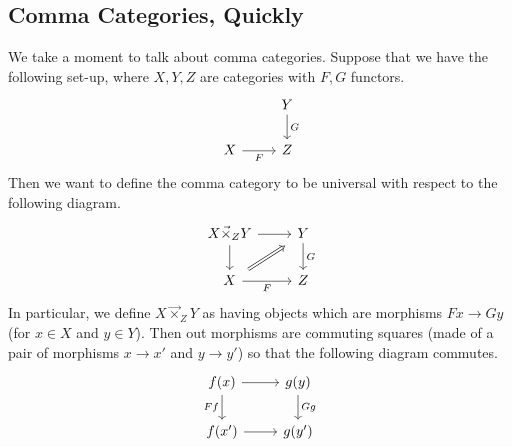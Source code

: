 \subsection{Comma Categories, Quickly}
We take a moment to talk about comma categories. Suppose that we have the following set-up, where $X,Y,Z$ are categories with $F,G$ functors.
\[\begin{tikzcd}
	& Y \\
	X & Z
	\arrow["F"', from=2-1, to=2-2]
	\arrow["G", from=1-2, to=2-2]
\end{tikzcd}\]
Then we want to define the comma category to be universal with respect to the following diagram.
\[\begin{tikzcd}
	{X\vec{\times}_ZY} & Y \\
	X & Z
	\arrow["F"', from=2-1, to=2-2]
	\arrow["G", from=1-2, to=2-2]
	\arrow[from=1-1, to=2-1]
	\arrow[from=1-1, to=1-2]
	\arrow[shorten <=5pt, shorten >=5pt, Rightarrow, from=2-1, to=1-2]
\end{tikzcd}\]
In particular, we define $X\vec\times_ZY$ as having objects which are morphisms $Fx\to Gy$ (for $x\in X$ and $y\in Y$). Then out morphisms are commuting squares (made of a pair of morphisms $x\to x'$ and $y\to y'$) so that the following diagram commutes.
\[\begin{tikzcd}
	{f(x)} & {g(y)} \\
	{f(x')} & {g(y')}
	\arrow["Ff"', from=1-1, to=2-1]
	\arrow["Gg", from=1-2, to=2-2]
	\arrow[from=1-1, to=1-2]
	\arrow[from=2-1, to=2-2]
\end{tikzcd}\]

